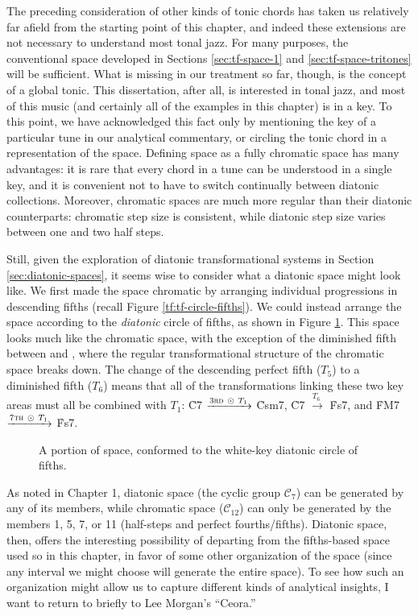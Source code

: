 The preceding consideration of other kinds of tonic chords has taken us
relatively far afield from the starting point of this chapter, and indeed
these extensions are not necessary to understand most tonal jazz. For many
purposes, the conventional space developed in Sections \ref{sec:tf-space-1}
and \ref{sec:tf-space-tritones} will be sufficient. What is missing in our
treatment so far, though, is the concept of a global tonic. This dissertation,
after all, is interested in tonal jazz, and most of this music (and certainly
all of the examples in this chapter) is in a key. To this point, we have
acknowledged this fact only by mentioning the key of a particular tune in our
analytical commentary, or circling the tonic chord in a representation of the
space. Defining \tf space as a fully chromatic space has many advantages: it
is rare that every chord in a tune can be understood in a single key, and it
is convenient not to have to switch continually between diatonic collections.
Moreover, chromatic spaces are much more regular than their diatonic
counterparts: chromatic step size is consistent, while diatonic step size
varies between one and two half steps.

Still, given the exploration of diatonic transformational systems in Section
\ref{sec:diatonic-spaces}, it seems wise to consider what a diatonic \tf space
might look like. We first made the space chromatic by arranging individual
\tfo progressions in descending fifths (recall Figure
\ref{tf:tf-circle-fifths}). We could instead arrange the space according to
the \emph{diatonic} circle of fifths, as shown in Figure
\ref{tfe:tf-diatonic-fifths}. This space looks much like the chromatic space,
with the exception of the diminished fifth between  and , where the
regular transformational structure of the chromatic space breaks down. The
change of the descending perfect fifth ($T_5$) to a diminished fifth ($T_6$)
means that all of the transformations linking these two key areas must all be
combined with $T_1$: \h{C7} $\xrightarrow{3\text{\textsc{rd}}\ \odot\ T_1}$
\h{Csm7}, \h{C7} $\xrightarrow{T_6\;}$ \h{Fs7}, and \h{FM7}
$\xrightarrow{7\text{\textsc{th}}\ \odot\ T_1}$ \h{Fs7}.

\begin{figure}[tbp]
  \caption{A portion of \tf space, conformed to the white-key diatonic circle
    of fifths.}
  \label{tfe:tf-diatonic-fifths}
\end{figure}

As noted in Chapter 1, diatonic space (the cyclic group $\mathcal{C}_7$) can
be generated by any of its members, while chromatic space ($\mathcal{C}_{12}$)
can only be generated by the members 1, 5, 7, or 11 (half-steps and perfect
fourths/fifths). Diatonic \tf space, then, offers the interesting possibility
of departing from the fifths-based space used so in this chapter, in
favor of some other organization of the space (since any interval we might
choose will generate the entire space). To see how such an organization
might allow us to capture different kinds of analytical insights, I want to
return to briefly to Lee Morgan's ``Ceora.''

